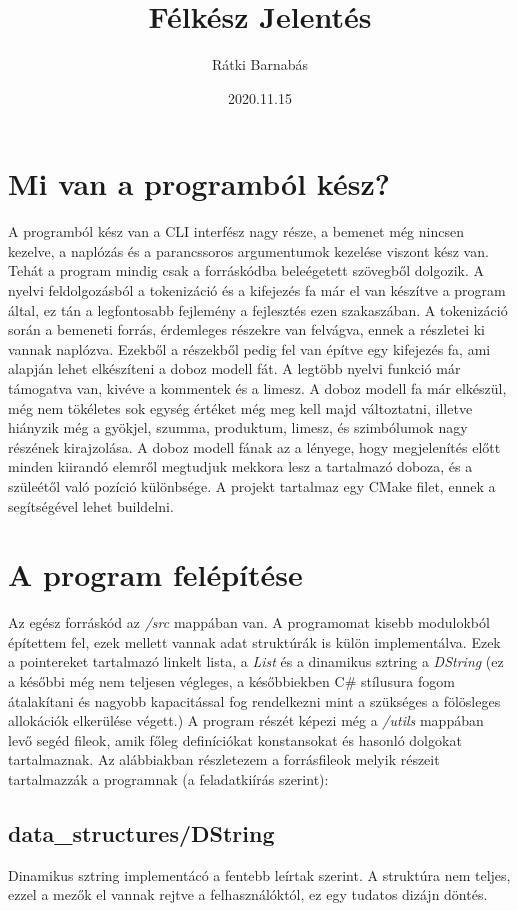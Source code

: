 \documentclass{article}[12pt,a4paper]
\title{Félkész Jelentés}
\author{Rátki Barnabás}
\date{2020.11.15}
\newcommand{\lang}[1]{\textit{#1}}
\begin{document}
    \maketitle

    \section{Mi van a programból kész?}
    A programból kész van a CLI interfész nagy része, a bemenet még nincsen kezelve, a naplózás és a parancssoros argumentumok kezelése viszont kész van.
    Tehát a program mindig csak a forráskódba beleégetett szövegből dolgozik.
    A nyelvi feldolgozásból a tokenizáció és a kifejezés fa már el van készítve a program által, ez tán a legfontosabb fejlemény a fejlesztés ezen szakaszában.
    A tokenizáció során a bemeneti forrás, érdemleges részekre van felvágva, ennek a részletei ki vannak naplózva.
    Ezekből a részekből pedig fel van építve egy kifejezés fa, ami alapján lehet elkészíteni a doboz modell fát.
    A legtöbb nyelvi funkció már támogatva van, kivéve a kommentek és a limesz.
    A doboz modell fa már elkészül, még nem tökéletes sok egység értéket még meg kell majd változtatni, illetve hiányzik még a gyökjel, szumma, produktum, limesz, és szimbólumok nagy részének kirajzolása.
    A doboz modell fának az a lényege, hogy megjelenítés előtt minden kiirandó elemről megtudjuk mekkora lesz a tartalmazó doboza, és a szüleétől való pozíció különbsége.
    A projekt tartalmaz egy CMake filet, ennek a segítségével lehet buildelni.

    \section{A program felépítése}
    Az egész forráskód az \lang{/src} mappában van.
    A programomat kisebb modulokból építettem fel, ezek mellett vannak adat struktúrák is külön implementálva.
    Ezek a pointereket tartalmazó linkelt lista, a \lang{List} és a dinamikus sztring a \lang{DString} (ez a későbbi még nem teljesen végleges, a későbbiekben C\# stílusura fogom átalakítani és nagyobb kapacitással fog rendelkezni mint a szükséges a fölösleges allokációk elkerülése végett.)
    A program részét képezi még a \lang{/utils} mappában levő segéd fileok, amik főleg definíciókat konstansokat és hasonló dolgokat tartalmaznak.
    Az alábbiakban részletezem a forrásfileok melyik részeit tartalmazzák a programnak (a feladatkiírás szerint):
    
    \subsection{data\_structures/DString}
    Dinamikus sztring implementácó a fentebb leírtak szerint.
    A struktúra nem teljes, ezzel a mezők el vannak rejtve a felhasználóktól, ez egy tudatos dizájn döntés.
\end{document}
